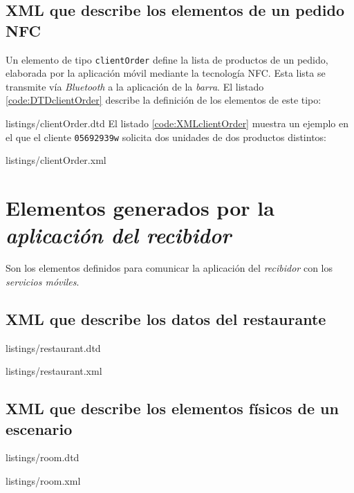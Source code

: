 \subsection{\acs{XML} que describe los elementos de un pedido \acs{NFC}}
Un elemento de tipo \texttt{clientOrder} define la lista de productos de
un pedido, elaborada por la aplicación móvil mediante la tecnología \acs{NFC}.
Esta lista se transmite vía \emph{Bluetooth} a la aplicación de la
\emph{barra}. El listado \ref{code:DTDclientOrder} describe la definición de
los elementos de este tipo:

{listings/clientOrder.dtd}
El listado \ref{code:XMLclientOrder} muestra un ejemplo en el que el cliente
\texttt{05692939w} solicita dos unidades de dos productos distintos:

{listings/clientOrder.xml}

\section{Elementos generados por la \emph{aplicación del recibidor}}
Son los elementos definidos para comunicar la aplicación del \emph{recibidor}
con los \emph{servicios móviles}.
\subsection{\acs{XML} que describe los datos del restaurante}

{listings/restaurant.dtd}

{listings/restaurant.xml}

\subsection{\acs{XML} que describe los elementos físicos de un escenario}

{listings/room.dtd}

{listings/room.xml}

